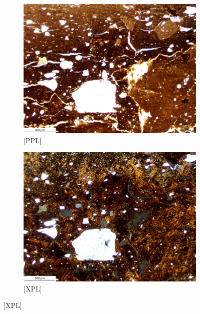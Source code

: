 \documentclass[a4paper]{article}
\begin{document}
\begin{figure}[H]
\begin{subfigure}[t]{.49\textwidth}
		\includegraphics[width=\textwidth]{ThinSections/46-4_4x_PPL.jpg}
		\caption{[PPL]}
	\end{subfigure}\hspace{.5em}\hfill
	\begin{subfigure}[t]{.49\textwidth}
		\includegraphics[width=\textwidth]{ThinSections/46-4_4x_XPL.jpg}
		\caption{[XPL]}
	\end{subfigure}

\end{figure}
\end{document}
